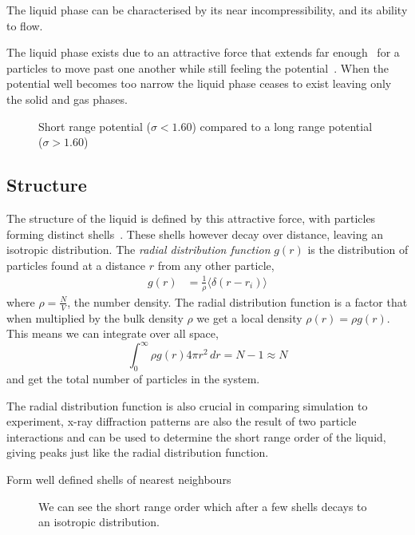 The liquid phase can be characterised by its near incompressibility, and its ability to flow. 

The liquid phase exists due to an attractive force that extends far enough~ for a particles to move past one another while still feeling the potential~\cite{tejero:94}. When the potential well becomes too narrow the liquid phase ceases to exist leaving only the solid and gas phases.

\begin{figure}
    \label{fig:potentials}
    \caption{Short range potential ($\sigma < 1.60$) compared to a long range potential ($\sigma > 1.60$)}
\end{figure}

\subsection{Structure}
The structure of the liquid is defined by this attractive force, with particles forming distinct shells~. These shells however decay over distance, leaving an isotropic distribution. The \emph{radial distribution function} $g(r)$ is the distribution of particles found at a distance $r$ from any other particle,
\begin{align}
    g(r) &= \frac{1}{\rho} \langle \delta(r - r_i) \rangle
\end{align}
where $\rho = \frac{N}{V}$, the number density. The radial distribution function is a factor that when multiplied by the bulk density $\rho$ we get a local density $\rho(r) = \rho g(r)$. This means we can integrate over all space,
\begin{equation}
    \int_0^\infty \rho g(r) 4 \pi r^2\,dr = N-1 \approx N
\end{equation}
and get the total number of particles in the system.

The radial distribution function is also crucial in comparing simulation to experiment, x-ray diffraction patterns are also the result of two particle interactions and can be used to determine the short range order of the liquid, giving peaks just like the radial distribution function.

Form well defined shells of nearest neighbours~\cite[p2]{barrat:03}
\begin{figure}
    \label{fig:radial distribution}
    \caption{We can see the short range order which after a few shells decays to an isotropic distribution.}
\end{figure}

